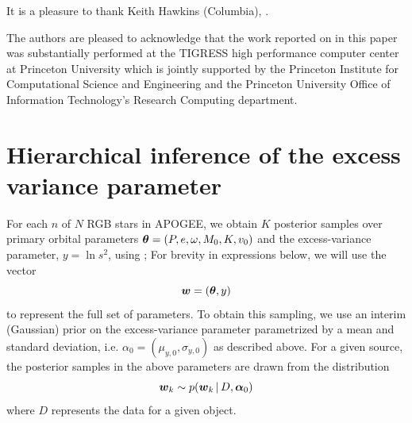 \documentclass[modern, letterpaper]{aastex62}
\newcommand{\apogee}{\project{\acronym{APOGEE}}}
\newcommand{\sdssiv}{\project{\acronym{SDSS-IV}}}
\newcommand{\thejoker}{\project{The~Joker}}
\begin{document}
\acknowledgements

It is a pleasure to thank Keith Hawkins (Columbia), .

The authors are pleased to acknowledge that the work reported on in this
paper was substantially performed at the TIGRESS high performance computer
center at Princeton University which is jointly supported by the Princeton
Institute for Computational Science and Engineering and the Princeton
University Office of Information Technology's Research Computing department.


\facility{\sdssiv, \apogee}




\clearpage

\appendix
\section{Hierarchical inference of the excess variance parameter}
\label{sec:hierarch}

For each $n$ of $N$ RGB stars in APOGEE, we obtain $K$ posterior samples over
primary orbital parameters $\boldsymbol{\theta} = (P, e, \omega, M_0, K, v_0)$ and the
excess-variance parameter, $y = \ln s^2$, using \thejoker; For brevity in
expressions below, we will use the vector
\begin{equation}
    \bs{w} = (\bs{\theta}, y)
\end{equation}
to represent the full set of parameters.
To obtain this sampling, we use an interim (Gaussian) prior on the
excess-variance parameter parametrized by a mean and standard deviation, i.e.
$\alpha_0 = (\mu_{y,0}, \sigma_{y,0})$ as described above.
For a given source, the posterior samples in the above parameters are drawn from
the distribution
\begin{equation}
    \bs{w}_k \sim p(\bs{w}_k \given D, \bs{\alpha}_0)
\end{equation}
where $D$ represents the data for a given object.
\end{document}
